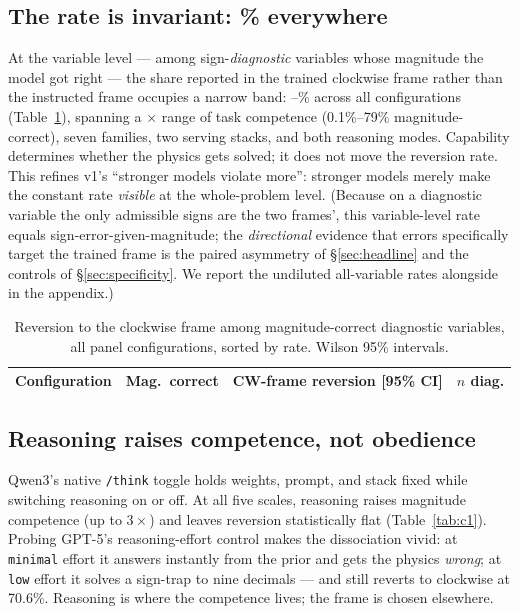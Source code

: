 \documentclass[11pt]{article}
\begin{document}
\subsection{The rate is invariant: \BandMean\% everywhere}
\label{sec:invariance}

At the variable level --- among sign-\emph{diagnostic} variables whose
magnitude the model got right --- the share reported in the trained clockwise
frame rather than the instructed frame occupies a narrow band:
\BandMin--\BandMax\% across all \BandN{} configurations
(Table~\ref{tab:invariance}), spanning a \CompetenceSpanX$\times$ range of
task competence (0.1\%--79\% magnitude-correct), seven families, two serving
stacks, and both reasoning modes. Capability determines whether the physics
gets solved; it does not move the reversion rate. This refines v1's
``stronger models violate more'': stronger models merely make the constant
rate \emph{visible} at the whole-problem level. (Because on a diagnostic
variable the only admissible signs are the two frames', this variable-level
rate equals sign-error-given-magnitude; the \emph{directional} evidence that
errors specifically target the trained frame is the paired asymmetry of
\S\ref{sec:headline} and the controls of \S\ref{sec:specificity}. We report
the undiluted all-variable rates alongside in the appendix.)

\begin{table}[t]
\centering\small
\begin{tabular}{lccc}
\toprule
Configuration & Mag.\ correct & CW-frame reversion [95\% CI] & $n$ diag.\\
\midrule

\bottomrule
\end{tabular}
\caption{Reversion to the clockwise frame among magnitude-correct diagnostic
variables, all \BandN{} panel configurations, sorted by rate. Wilson 95\%
intervals.}
\label{tab:invariance}
\end{table}

\subsection{Reasoning raises competence, not obedience}
\label{sec:reasoning}

Qwen3's native \texttt{/think} toggle holds weights, prompt, and stack fixed
while switching reasoning on or off. At all five scales, reasoning raises
magnitude competence (up to $3\times$) and leaves reversion statistically flat
(Table~\ref{tab:c1}). Probing GPT-5's reasoning-effort control makes the
dissociation vivid: at \texttt{minimal} effort it answers instantly from the
prior and gets the physics \emph{wrong}; at \texttt{low} effort it solves a
sign-trap to nine decimals --- and still reverts to clockwise at 70.6\%.
Reasoning is where the competence lives; the frame is chosen elsewhere.
\end{document}
